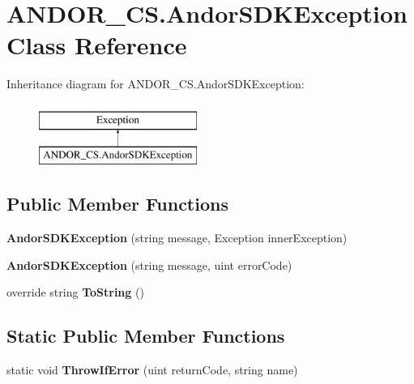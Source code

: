 \hypertarget{class_a_n_d_o_r___c_s_1_1_andor_s_d_k_exception}{}\section{A\+N\+D\+O\+R\+\_\+\+C\+S.\+Andor\+S\+D\+K\+Exception Class Reference}
\label{class_a_n_d_o_r___c_s_1_1_andor_s_d_k_exception}
Inheritance diagram for A\+N\+D\+O\+R\+\_\+\+C\+S.\+Andor\+S\+D\+K\+Exception\+:\begin{figure}[H]
\begin{center}
\leavevmode
\includegraphics[height=2.000000cm]{class_a_n_d_o_r___c_s_1_1_andor_s_d_k_exception}
\end{center}
\end{figure}
\subsection*{Public Member Functions}
\begin{DoxyCompactItemize}
\item 
\mbox{\label{class_a_n_d_o_r___c_s_1_1_andor_s_d_k_exception_a1e675899a93782c4ea38b7e4fd392412}} 
{\bfseries Andor\+S\+D\+K\+Exception} (string message, Exception inner\+Exception)
\item 
\mbox{\label{class_a_n_d_o_r___c_s_1_1_andor_s_d_k_exception_ae70bdebd141cf9e5a0c373ad9d8f5d2b}} 
{\bfseries Andor\+S\+D\+K\+Exception} (string message, uint error\+Code)
\item 
\mbox{\label{class_a_n_d_o_r___c_s_1_1_andor_s_d_k_exception_a9b1dfe6a22b21f958b6ac5231c242b8b}} 
override string {\bfseries To\+String} ()
\end{DoxyCompactItemize}
\subsection*{Static Public Member Functions}
\begin{DoxyCompactItemize}
\item 
\mbox{\label{class_a_n_d_o_r___c_s_1_1_andor_s_d_k_exception_a41cb39ae2cbd91b9f587aa9587939396}} 
static void {\bfseries Throw\+If\+Error} (uint return\+Code, string name)
\end{DoxyCompactItemize}
